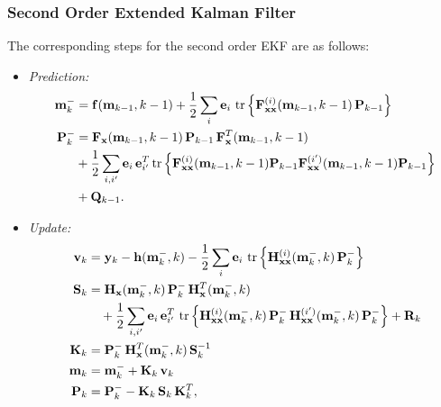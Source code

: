 \subsubsection{Second Order Extended Kalman Filter}

The corresponding steps for the second order EKF are as follows:
  \begin{itemize}
  \item {\em Prediction:}
  \begin{equation}
  \begin{split}
    \mathbf{m}^-_{k} &= \mathbf{f}(\mathbf{m}_{k-1},k-1) 
    + \frac{1}{2} \sum_i \mathbf{e}_i \,
      \operatorname{tr}\left\{ \mathbf{F}_{\mathbf{x}\mathbf{x}}^{(i)}(\mathbf{m}_{k-1},k-1) \,
      \mathbf{P}_{k-1} \right\} \\
    \mathbf{P}^-_{k} &= \mathbf{F}_{\mathbf{x}}(\mathbf{m}_{k-1},k-1) \, \mathbf{P}_{k-1} \,
     \mathbf{F}^T_{\mathbf{x}}(\mathbf{m}_{k-1},k-1) \\
   &+ \frac{1}{2} \sum_{i,i'} \mathbf{e}_i \, \mathbf{e}^T_{i'}
      \operatorname{tr}\left\{ \mathbf{F}_{\mathbf{x}\mathbf{x}}^{(i)}(\mathbf{m}_{k-1},k-1) \mathbf{P}_{k-1} 
       \mathbf{F}_{\mathbf{x}\mathbf{x}}^{(i')}(\mathbf{m}_{k-1},k-1) \mathbf{P}_{k-1} \right\} \\
    &+ \mathbf{Q}_{k-1}.
  \end{split}
  \label{eq:dekf_predict2}
  \end{equation}

  \item {\em Update:}
  \begin{equation}
  \begin{split}
    \mathbf{v}_{k} &= \mathbf{y}_k - \mathbf{h} (\mathbf{m}^-_{k},k) 
    - \frac{1}{2} \sum_i \mathbf{e}_i \,
      \operatorname{tr}\left\{ \mathbf{H}_{\mathbf{x}\mathbf{x}}^{(i)}(\mathbf{m}^-_{k},k) \,
      \mathbf{P}^-_{k} \right\} \\
    \mathbf{S}_{k} &= \mathbf{H}_{\mathbf{x}}(\mathbf{m}^-_{k},k) \, \mathbf{P}^-_{k} \,
    \mathbf{H}^T_{\mathbf{x}}(\mathbf{m}^-_{k},k) \\
    &\quad + \frac{1}{2} \sum_{i,i'} \mathbf{e}_i \, \mathbf{e}^T_{i'} \,
      \operatorname{tr}\left\{ \mathbf{H}_{\mathbf{x}\mathbf{x}}^{(i)}(\mathbf{m}^-_{k},k) \, \mathbf{P}^-_{k} \,
       \mathbf{H}_{\mathbf{x}\mathbf{x}}^{(i')}(\mathbf{m}^-_{k},k) \, \mathbf{P}^-_{k} \right\} 
    + \mathbf{R}_{k} \\
    \mathbf{K}_{k} &= \mathbf{P}^-_{k} \,
    \mathbf{H}^T_{\mathbf{x}}(\mathbf{m}^-_{k},k) \, \mathbf{S}^{-1}_{k} \\
    \mathbf{m}_{k} &= \mathbf{m}^-_{k} + \mathbf{K}_{k} \, \mathbf{v}_k \\
    \mathbf{P}_{k} &= \mathbf{P}^-_{k} - \mathbf{K}_{k} \, \mathbf{S}_{k} \, \mathbf{K}^T_{k},
  \end{split}
  \label{eq:dekf_update2}
  \end{equation}
  \end{itemize}

